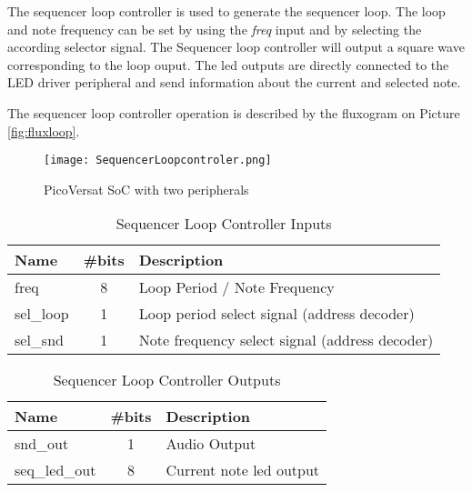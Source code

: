 \noindent The sequencer loop controller is used to generate the sequencer loop. The loop and note frequency can be set by using the \textit{freq} input and by selecting the according selector signal.
The Sequencer loop controller will output a square wave corresponding to the loop ouput. The led outputs are directly connected to the LED driver peripheral and send information about the current and selected note. 

\noindent The sequencer loop controller operation is described by the fluxogram on Picture \ref{fig:fluxloop}.


\begin{figure}[!htbp]
    \centerline{\texttt{[image: SequencerLoopcontroler.png]}}
    \vspace{0cm}\caption{PicoVersat SoC with two peripherals}
    \label{fig:periphs}
\end{figure}

\begin{table}[!htbp]
    \centering
    \caption{Sequencer Loop Controller Inputs}
    \label{tab:slcIn}
    \begin{tabular}{@{}lcl@{}}
    \toprule
    Name      & \multicolumn{1}{l}{\#bits} & Description                                    \\ \midrule
    freq & 8                          & Loop Period / Note Frequency                                    \\
    sel\_loop & 1                          & Loop period select signal (address decoder)    \\
    sel\_snd  & 1                          & Note frequency select signal (address decoder) \\ \bottomrule
    \end{tabular}
    \end{table}

\begin{table}[!htbp]
    \centering
    \caption{Sequencer Loop Controller Outputs}
    \label{tab:slcOut}
    \begin{tabular}{@{}lcl@{}}
    \toprule
    Name          & \multicolumn{1}{l}{\#bits} & Description             \\ \midrule
    snd\_out      & 1                          & Audio Output            \\
    seq\_led\_out & 8                          & Current note led output \\ \bottomrule
    \end{tabular}
    \end{table}

